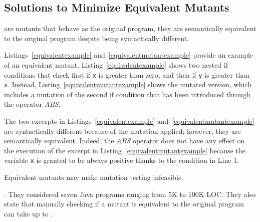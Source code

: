 
\subsection{Solutions to Minimize Equivalent Mutants}
\label{sec:opt:equivalent}

 are mutants that behave as the original program, they are semantically equivalent to the original program despite being syntactically different. 


Listings~\ref{equivalentexample} and~\ref{equivalentmutantexample} provide an example of an equivalent mutant. Listing~\ref{equivalentexample} shows two nested if conditions that check first if \texttt{x} is greater than zero, and then if \texttt{y} is greater than \texttt{x}. Instead, Listing~\ref{equivalentmutantexample} shows the mutated version, which
includes a mutation of the second if condition that has been introduced through the operator \textit{ABS}.



The two excerpts in Listings~\ref{equivalentexample} and~\ref{equivalentmutantexample} are syntactically different because of the mutation applied; however, they are semantically equivalent. Indeed, the \textit{ABS} operator does not have any effect on the execution of the excerpt in Listing~\ref{equivalentmutantexample} because the variable \texttt{x} is granted to be always positive thanks to the condition in Line 1.

Equivalent mutants may make mutation testing infeasible.  

. 
They considered seven Java programs ranging from 5K to 100K LOC.
They also state that manually checking if a mutant is equivalent to the original program can take up to .

